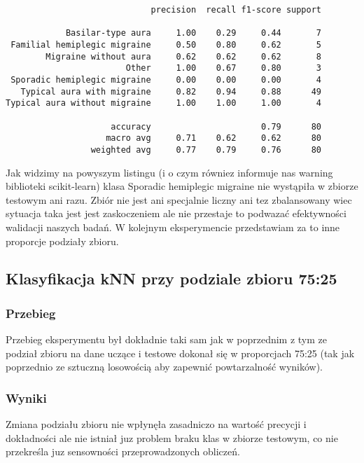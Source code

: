 \begin{verbatim}
                             precision  recall f1-score support

            Basilar-type aura     1.00    0.29     0.44       7
 Familial hemiplegic migraine     0.50    0.80     0.62       5
        Migraine without aura     0.62    0.62     0.62       8
                        Other     1.00    0.67     0.80       3
 Sporadic hemiplegic migraine     0.00    0.00     0.00       4
   Typical aura with migraine     0.82    0.94     0.88      49
Typical aura without migraine     1.00    1.00     1.00       4

                     accuracy                      0.79      80
                    macro avg     0.71    0.62     0.62      80
                 weighted avg     0.77    0.79     0.76      80
\end{verbatim}

Jak widzimy na powyszym listingu (i o czym równiez informuje nas warning biblioteki scikit-learn) klasa Sporadic hemiplegic migraine nie wystąpiła w zbiorze testowym ani razu. Zbiór nie jest ani specjalnie liczny ani tez zbalansowany wiec sytuacja taka jest jest zaskoczeniem ale nie przestaje to podwazać efektywności walidacji naszych badań. W kolejnym eksperymencie przedstawiam za to inne proporcje podziały zbioru.

\subsection{Klasyfikacja kNN przy podziale zbioru 75:25}
\subsubsection{Przebieg}
Przebieg eksperymentu był dokładnie taki sam jak w poprzednim z tym ze podział zbioru na dane uczące i testowe dokonał się w proporcjach 75:25 (tak jak poprzednio ze sztuczną losowością aby zapewnić powtarzalność wyników).\\

\subsubsection{Wyniki}
Zmiana podziału zbioru nie wpłynęła zasadniczo na wartość precycji i dokładności ale nie istniał juz problem braku klas w zbiorze testowym, co nie przekreśla juz sensowności przeprowadzonych obliczeń.\\

